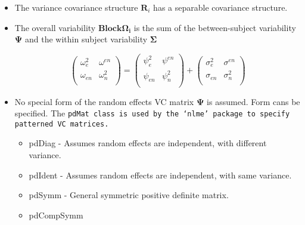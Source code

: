 \documentclass[12pt, a4paper]{article}
\begin{document}
\begin{itemize}
	\item The variance covariance structure $\boldsymbol{R}_{i}$ has a separable covariance structure.
	
	\item The overall variability $\boldsymbol{\mbox{Block} \Omega_{i}}$ is the sum of the
	between-subject variability $\boldsymbol{\Psi}$
	and the within subject variability $\boldsymbol{\Sigma}$
	
	\begin{equation}
	\left( \begin{array}{cc}
	\omega^2_{e} & \omega^{en} \\
	\omega_{en} & \omega^2_{n} \\
	\end{array}\right)
	=
	\left( \begin{array}{cc}
	\psi^2_{e} & \psi^{en} \\
	\psi_{en} & \psi^2_{n} \\
	\end{array}\right)
	+
	\left( \begin{array}{cc}
	\sigma^2_{e} & \sigma^{en} \\
	\sigma_{en} & \sigma^2_{n} \\
	\end{array}\right)
	\end{equation}
	
	\item  No special form of the random effects VC matrix $\boldsymbol{\Psi}$ is assumed.
	Form cans be specified.
	The \tt{pdMat} class is used by the `nlme' package to specify patterned VC matrices.
	\begin{itemize}
		\item pdDiag - Assumes random effects are independent, with different variance.
		\item pdIdent - Assumes random effects are independent, with same variance.
		\item pdSymm - General symmetric positive definite matrix.
		\item pdCompSymm
	\end{itemize}
	
\end{itemize}
























\end{document}
